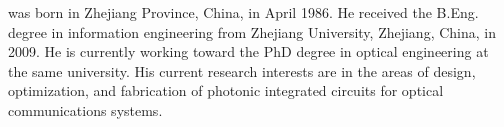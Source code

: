 was born in Zhejiang Province, China, in April 1986. He received the
B.Eng. degree in information engineering from Zhejiang University,
Zhejiang, China, in 2009. He is currently working toward the PhD
degree in optical engineering at the same university. His current
research interests are in the areas of design, optimization, and
fabrication of photonic integrated circuits for optical
communications systems.
